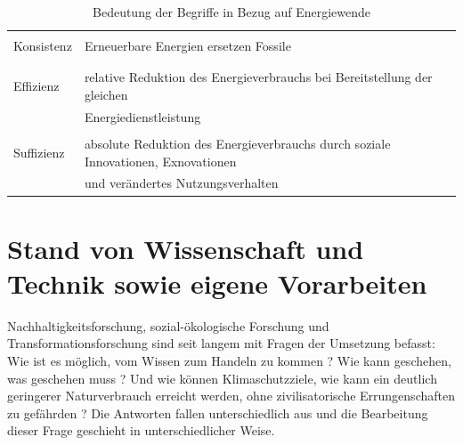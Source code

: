 \documentclass[a4paper,11pt,twoside]{scrartcl}
\begin{document}
\begin{table}[h]
\begin{center}
\small
  \caption{Bedeutung der Begriffe in Bezug auf Energiewende}
\begin{tabular}[h]{|l | l |}
\hline
&\\
Konsistenz & Erneuerbare Energien ersetzen Fossile\\
&\\
\hline
&\\
 Effizienz & relative Reduktion des Energieverbrauchs bei Bereitstellung der gleichen\\
 & Energiedienstleistung\\
 \hline
 &\\
Suffizienz & absolute Reduktion des Energieverbrauchs durch soziale Innovationen, Exnovationen\\
& und verändertes Nutzungsverhalten \\
 \hline
 \end{tabular}
 \label{tab:koefsu}
\end{center}
\end{table}

\section{Stand von Wissenschaft und Technik sowie eigene Vorarbeiten}
\label{sec:2}

Nachhaltigkeitsforschung, sozial-ökologische Forschung und Transformationsforschung sind seit langem mit Fragen der Umsetzung befasst: Wie ist es möglich, vom Wissen zum Handeln zu kommen ? \cite{BMBF2008} Wie kann geschehen, was geschehen muss ? \cite{Linz2000} Und wie können Klimaschutzziele, wie kann ein deutlich geringerer Naturverbrauch erreicht werden, ohne zivilisatorische Errungenschaften zu gefährden ? \cite{Sommer2016,WGBU2011} Die Antworten fallen unterschiedlich aus und die Bearbeitung dieser Frage geschieht in unterschiedlicher Weise.
\end{document}
